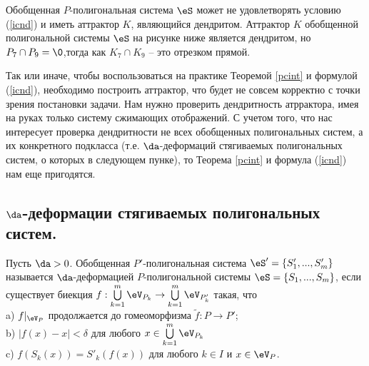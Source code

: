 \begin{rmk} 
Обобщенная $P$-полигональная система $\eS$ может не удовлетворять условию (\ref{icnd}) и иметь аттрактор $K$, являющийся дендритом. Аттрактор $K$ обобщенной полигональной системы $\eS$ на рисунке ниже является дендритом, но  $P_7\cap P_9=\0$,тогда как $K_7\cap K_9$ -- это отрезком прямой.
\end{rmk}

\begin{figure}[h!]
\centering
{}
 \caption{}%
\label{cntrex}%
\end{figure}

Так или иначе, чтобы воспользоваться на практике Теоремой \ref{pcint} и формулой (\ref{icnd}), необходимо построить аттрактор, что будет не совсем корректно с точки зрения постановки задачи. Нам нужно проверить дендритность атррактора, имея на руках только систему сжимающих отображений. С учетом того, что нас интересует проверка дендритности не всех обобщенных полигональных систем, а их конкретного подкласса (т.е. $\da$-деформаций стягиваемых полигональных систем, о которых в следующем пунке), то Теорема \ref{pcint} и формула (\ref{icnd}) нам еще пригодятся.%


\subsection{ $\da$-деформации стягиваемых полигональных систем.}

\begin{definition}\label{deform} 
Пусть $\da>0$. Обобщенная $P'$-полигональная система $\eS'=\{S'_1,...,S'_m\}$ называется $\da$-деформацией $P$-полигональной системы $\eS=\{S_1,...,S_m\}$, если существует биекция $f:\bigcup\limits_{k=1}^m \eV_{P_k}\to \bigcup\limits_{k=1}^m \eV_{P'_k}$ такая, что\\
a) $f|_{\eV_P}$ продолжается до гомеоморфизма $\tilde f: P\to  P'$; \\ b) $|f(x)-x|<\delta$  для любого $x\in \bigcup\limits_{k=1}^m \eV_{P_k}$\\  c) $f(S_k(x))=S'_k(f(x))$ для любого $k\in I$ и $x\in \eV_P$.\bigskip
\end{definition}

